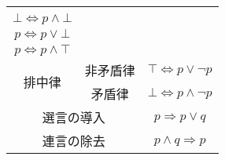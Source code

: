 \documentclass[a4paper]{jsarticle}
\begin{document}
\begin{thm}
\begin{longtable}[c]{|cc|c|}
\begin{tabular}{c}
  $\top \Leftrightarrow p \vee \top $ \\
  $\bot \Leftrightarrow p \land \bot $ \\
  $p \Leftrightarrow p \vee \bot $ \\
  $p \Leftrightarrow p \land \top$ 
\end{tabular}\\
\hline
\multicolumn{1}{|c}{\multirow{2}{*}{排中律}} & \multicolumn{1}{|c|}{非矛盾律} & $\top \Leftrightarrow p \vee \neg p$ \\ \cline{2-3}
& \multicolumn{1}{|c|}{矛盾律} & $\bot \Leftrightarrow p \land \neg p$ \\
\hline
\multicolumn{2}{|c|}{選言の導入} & $p \Rightarrow p \vee q$ \\
\hline
\multicolumn{2}{|c|}{連言の除去} & $p \land q \Rightarrow p$ \\
\hline
\end{longtable}
\end{thm}
\end{document}

